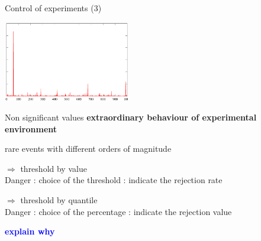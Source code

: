 \documentclass[xcolor=x11names,compress,8pt,
]{beamer}
\renewcommand{\(}{\begin{columns}}
\renewcommand{\)}{\end{columns}}
\newcommand{\<}[1]{\begin{column}{#1}}
\renewcommand{\>}{\end{column}}
\begin{document}
\begin{frame}{Control of experiments (3)}
\begin{center}
\includegraphics[width=5.5cm]{CE-cauchy1.pdf}
\end{center}
\pause
\begin{block}{Non significant values}
\alert{\bf  extraordinary behaviour of experimental environment}

rare events with different orders of magnitude

$\Rightarrow$ threshold by value \\
Danger : choice of the threshold : indicate the rejection rate

$\Rightarrow$ threshold by quantile \\
Danger : choice of the percentage : indicate the rejection value

\textcolor{blue}{\bf explain why}
\end{block}
\end{frame}
\end{document}
